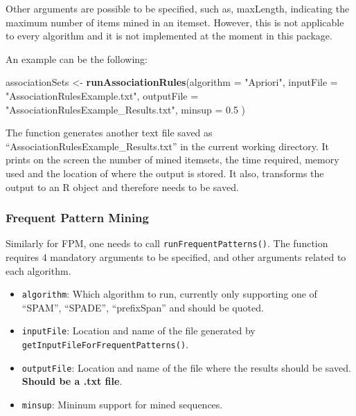 \documentclass[
]{article}
\newenvironment{Shaded}{\begin{snugshade}}{\end{snugshade}}
\newcommand{\DataTypeTok}[1]{\textcolor[rgb]{0.13,0.29,0.53}{#1}}
\newcommand{\FloatTok}[1]{\textcolor[rgb]{0.00,0.00,0.81}{#1}}
\newcommand{\KeywordTok}[1]{\textcolor[rgb]{0.13,0.29,0.53}{\textbf{#1}}}
\newcommand{\NormalTok}[1]{#1}
\newcommand{\StringTok}[1]{\textcolor[rgb]{0.31,0.60,0.02}{#1}}
\providecommand{\tightlist}{%
  \setlength{\itemsep}{0pt}\setlength{\parskip}{0pt}}
\begin{document}
Other arguments are possible to be specified, such as, maxLength,
indicating the maximum number of items mined in an itemset. However,
this is not applicable to every algorithm and it is not implemented at
the moment in this package.

An example can be the following:

\begin{Shaded}
\begin{Highlighting}[]
\NormalTok{associationSets <-}\StringTok{ }\KeywordTok{runAssociationRules}\NormalTok{(}\DataTypeTok{algorithm =} \StringTok{"Apriori"}\NormalTok{, }
                                       \DataTypeTok{inputFile =} \StringTok{"AssociationRulesExample.txt"}\NormalTok{, }
                                       \DataTypeTok{outputFile =} \StringTok{"AssociationRulesExample_Results.txt"}\NormalTok{,}
                                       \DataTypeTok{minsup =} \FloatTok{0.5}\NormalTok{ )}
\end{Highlighting}
\end{Shaded}

The function generates another text file saved as
``AssociationRulesExample\_Results.txt'' in the current working
directory. It prints on the screen the number of mined itemsets, the
time required, memory used and the location of where the output is
stored. It also, transforms the output to an R object and therefore
needs to be saved.

\hypertarget{frequent-pattern-mining}{%
\subsubsection{Frequent Pattern Mining}\label{frequent-pattern-mining}}

Similarly for FPM, one needs to call \texttt{runFrequentPatterns()}. The
function requires 4 mandatory arguments to be specified, and other
arguments related to each algorithm.

\begin{itemize}
\tightlist
\item
  \texttt{algorithm}: Which algorithm to run, currently only supporting
  one of ``SPAM'', ``SPADE'', ``prefixSpan'' and should be quoted.\\
\item
  \texttt{inputFile}: Location and name of the file generated by
  \texttt{getInputFileForFrequentPatterns()}.\\
\item
  \texttt{outputFile}: Location and name of the file where the results
  should be saved. \textbf{Should be a .txt file}.\\
\item
  \texttt{minsup}: Mininum support for mined sequences.
\end{itemize}
\end{document}
